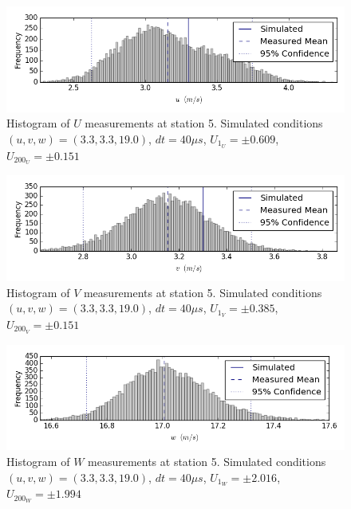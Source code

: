 \begin{figure}[H]
\centering
\includegraphics[width=6in]{figs/Ely_May28th05002/uncertainty_Ely_May28th05002_U}
\caption{Histogram of $U$ measurements at station 5. Simulated conditions $(u,v,w)=(3.3, 3.3, 19.0)$, $dt=40 \mu s$, $U_{1_{U}}=\pm 0.609$, $U_{200_{U}}=\pm 0.151$}
\label{fig:uncertainty_Ely_May28th05002_U}
\end{figure}


\begin{figure}[H]
\centering
\includegraphics[width=6in]{figs/Ely_May28th05002/uncertainty_Ely_May28th05002_V}
\caption{Histogram of $V$ measurements at station 5. Simulated conditions $(u,v,w)=(3.3, 3.3, 19.0)$, $dt=40 \mu s$, $U_{1_{V}}=\pm 0.385$, $U_{200_{V}}=\pm 0.151$}
\label{fig:uncertainty_Ely_May28th05002_V}
\end{figure}


\begin{figure}[H]
\centering
\includegraphics[width=6in]{figs/Ely_May28th05002/uncertainty_Ely_May28th05002_W}
\caption{Histogram of $W$ measurements at station 5. Simulated conditions $(u,v,w)=(3.3, 3.3, 19.0)$, $dt=40 \mu s$, $U_{1_{W}}=\pm 2.016$, $U_{200_{W}}=\pm 1.994$}
\label{fig:uncertainty_Ely_May28th05002_W}
\end{figure}


